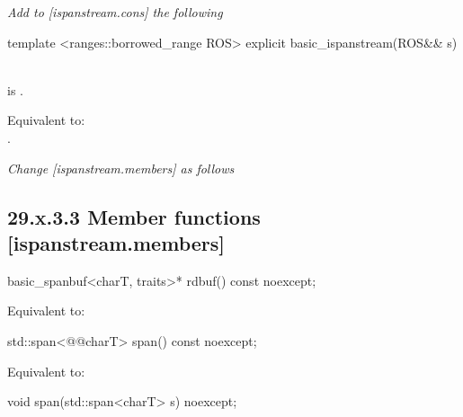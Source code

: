 \documentclass[ebook,11pt,article]{memoir}
\begin{document}
\emph{Add to [ispanstream.cons] the following}

\begin{addedblock}
\begin{itemdecl}
template <ranges::borrowed_range ROS>
explicit basic_ispanstream(ROS&& s)
\end{itemdecl}

\begin{itemdescr}
\pnum
\constraints
{}\\  is .

\pnum
\effects
Equivalent to:\\
.
\end{itemdescr}
\end{addedblock}



\emph{Change [ispanstream.members] as follows}
\subsection{29.x.3.3 Member functions [ispanstream.members]}
\label{ispanstream.members}

\begin{itemdecl}
basic_spanbuf<charT, traits>* rdbuf() const noexcept;
\end{itemdecl}

\begin{itemdescr}
\pnum
\effects Equivalent to:\\
\end{itemdescr}

\begin{itemdecl}
std::span<@@charT> span() const noexcept;
\end{itemdecl}

\begin{itemdescr}
\pnum
\effects Equivalent to:\\
\end{itemdescr}

\begin{itemdecl}
void span(std::span<charT> s) noexcept;
\end{itemdecl}
\end{document}
